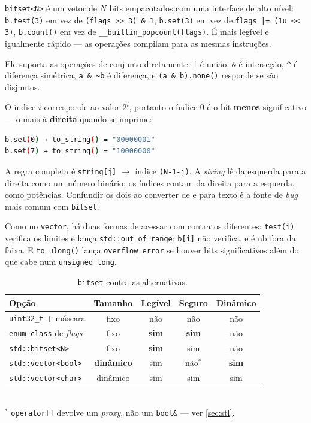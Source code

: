 \texttt{bitset<N>} é um vetor de $N$ bits empacotados com uma interface de alto
nível: \texttt{b.test(3)} em vez de \texttt{(flags >> 3) \& 1},
\texttt{b.set(3)} em vez de \texttt{flags |= (1u << 3)}, \texttt{b.count()} em
vez de \texttt{\_\_builtin\_popcount(flags)}. É mais legível e igualmente
rápido --- as operações compilam para as mesmas instruções.

Ele suporta as operações de conjunto diretamente: \texttt{|} é união,
\texttt{\&} é interseção, \texttt{\textasciicircum} é diferença simétrica,
\texttt{a \& \textasciitilde b} é diferença, e \texttt{(a \& b).none()} responde
se são disjuntos.

\begin{armadilha}
O índice $i$ corresponde ao valor $2^i$, portanto o índice 0 é o bit
\textbf{menos} significativo --- o mais à \textbf{direita} quando se imprime:
\begin{lstlisting}[style=bt, language=bash, frame=none,
                   xleftmargin=0pt, xrightmargin=0pt]
b.set(0) → to_string() = "00000001"
b.set(7) → to_string() = "10000000"
\end{lstlisting}
A regra completa é \texttt{string[j]} $\rightarrow$ índice \texttt{(N-1-j)}. A
\emph{string} lê da esquerda para a direita como um número binário; os índices
contam da direita para a esquerda, como potências. Confundir os dois ao
converter de e para texto é a fonte de \emph{bug} mais comum com
\texttt{bitset}.
\end{armadilha}

Como no \texttt{vector}, há duas formas de acessar com contratos diferentes:
\texttt{test(i)} verifica os limites e lança \texttt{std::out\_of\_range};
\texttt{b[i]} não verifica, e é \gls{ub} fora da faixa. E \texttt{to\_ulong()}
lança \texttt{overflow\_error} se houver bits significativos além do que cabe
num \texttt{unsigned long}.

\begin{table}[htbp]
\centering
\caption{\texttt{bitset} contra as alternativas.}
\label{tab:bitset-alternativas}
\footnotesize
\begin{tabular}{@{}lcccc@{}}
\toprule
\textbf{Opção} & \textbf{Tamanho} & \textbf{Legível} & \textbf{Seguro} & \textbf{Dinâmico} \\
\midrule
\texttt{uint32\_t} + máscara & fixo & não & não & não \\
\texttt{enum class} de \emph{flags} & fixo & \textbf{sim} & \textbf{sim} & não \\
\texttt{std::bitset<N>}      & fixo & \textbf{sim} & sim & não \\
\texttt{std::vector<bool>}   & \textbf{dinâmico} & sim & não$^*$ & \textbf{sim} \\
\texttt{std::vector<char>}   & dinâmico & sim & sim & sim \\
\bottomrule
\end{tabular}\\[2pt]
\footnotesize $^*$ \texttt{operator[]} devolve um \emph{proxy}, não um
\texttt{bool\&} --- ver \cref{sec:stl}.
\end{table}

